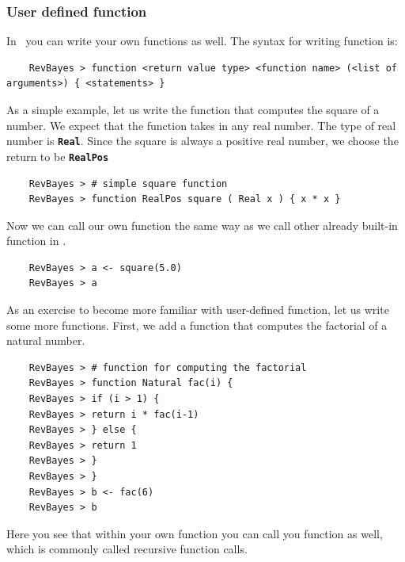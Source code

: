 \documentclass[11pt]{article}
\newcommand{\cl}[1]{{\texttt{\textbf{#1}}}}
\begin{document}
\subsubsection*{User defined function}
In \Rev~you can write your own functions as well.
The syntax for writing function is:
{\tt \begin{snugshade*}
\begin{lstlisting}    
    RevBayes > function <return value type> <function name> (<list of arguments>) { <statements> }
\end{lstlisting}
\end{snugshade*}}
As a simple example, let us write the function that computes the square of a number.
We expect that the function takes in any real number.
The type of real number is \cl{Real}.
Since the square is always a positive real number, we choose the return to be \cl{RealPos}
{\tt \begin{snugshade*}
\begin{lstlisting}    
    RevBayes > # simple square function
    RevBayes > function RealPos square ( Real x ) { x * x }
\end{lstlisting}
\end{snugshade*}}
Now we can call our own function the same way as we call other already built-in function in \RevBayes.
{\tt \begin{snugshade*}
\begin{lstlisting}    
    RevBayes > a <- square(5.0)
    RevBayes > a
\end{lstlisting}
\end{snugshade*}}
As an exercise to become more familiar with user-defined function, let us write some more functions.
First, we add a function that computes the factorial of a natural number.
{\tt \begin{snugshade*}
\begin{lstlisting}    
    RevBayes > # function for computing the factorial
    RevBayes > function Natural fac(i) {
    RevBayes > if (i > 1) {
    RevBayes > return i * fac(i-1)
    RevBayes > } else {
    RevBayes > return 1
    RevBayes > }
    RevBayes > }
    RevBayes > b <- fac(6)
    RevBayes > b
\end{lstlisting}
\end{snugshade*}}
Here you see that within your own function you can call you function as well, which is commonly called recursive function calls.
\end{document}
